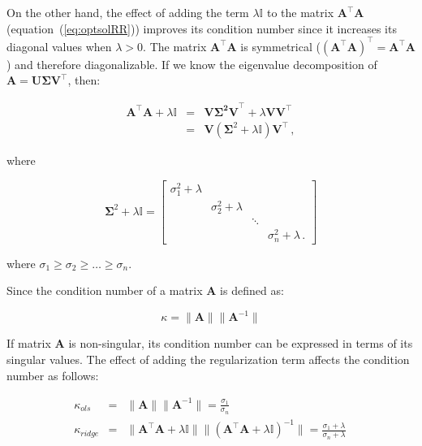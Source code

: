 On the other hand, the effect of adding the term $\lambda \mathbb{I}$
to the matrix $\mathbf{A}^\top \mathbf{A}$
(equation~(\ref{eq:optsolRR})) improves its condition number since it
increases its diagonal values when $\lambda > 0 $.  The matrix
$\mathbf{A}^\top \mathbf{A}$ is symmetrical ($(\mathbf{A}^\top
\mathbf{A})^\top = \mathbf{A}^\top \mathbf{A}$) and therefore
diagonalizable.  If we know the eigenvalue decomposition of $\mathbf{A}
= \mathbf{U\Sigma V^\top}$, then:

\begin{eqnarray*}
\mathbf{A}^\top \mathbf{A}+\lambda \mathbb{I}&=&\mathbf{V\Sigma^2
V}^\top + \lambda \mathbf{V} \mathbf{V}^\top\\ &=&\mathbf{V}
(\mathbf{\Sigma}^2+\lambda\mathbb{I}) \mathbf{V}^\top \, ,
\end{eqnarray*}

\noindent where

\begin{equation*}
\mathbf{\Sigma}^2+\lambda\mathbb{I}=
\begin{bmatrix}
\sigma^2_1 + \lambda & \, & \, \\
\, & \sigma^2_2 +\lambda & \, \\
\, & \, & \ddots & \, \\
\, & \, & \, & \sigma^2_n +\lambda \, .
\end{bmatrix}
\end{equation*}

where $\sigma_1 \geq \sigma_2 \geq \dots \geq \sigma_n$.

Since the condition number of a matrix $\mathbf{A}$ is defined as:

\begin{equation*}
	\kappa = \|\mathbf{A}\| \|\mathbf{A}^{-1}\|
\end{equation*}

If matrix $\mathbf{A}$ is non-singular, its condition number can be
expressed in terms of its singular values. The effect of adding the
regularization term affects the condition number as follows:

\begin{eqnarray*}
\kappa_{ols} &=& \|\mathbf{A}\| \|\mathbf{A}^{-1}\|=\frac{\sigma_1}{\sigma_n} \\
\kappa_{ridge} &=& \|\mathbf{A}^\intercal \mathbf{A} + \lambda \mathbb{I}\| 
\|(\mathbf{A}^\intercal \mathbf{A} + \lambda \mathbb{I})^{-1}\|=\frac{\sigma_1+\lambda}{\sigma_n + \lambda} \,
\end{eqnarray*}

